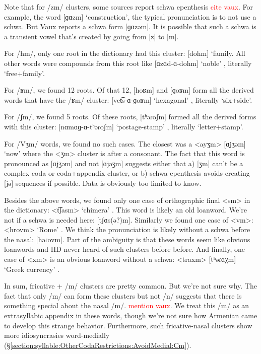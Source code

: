 	Note that for /zm/ clusters, some sources report schwa epenthesis \textcolor{red}{cite vaux}. For example, the word [ɡɑzm] `construction', the typical pronunciation is to not use a schwa. But Vaux reports a schwa form [ɡɑzəm]. It is possible that such a schwa is a transient vowel that's created by going from [z] to [m]. 
	
	
	For /hm/, only one root in the dictionary had this cluster:  [dohm] `family. All other words were compounds from this root like [ɑzɑd-ɑ-dohm] `noble' , literally `free+family'. 
	
	For /ʁm/, we found 12 roots. Of that 12, [hoʁm] and [ɡoʁm] form all the derived words that have the /ʁm/ cluster: [vet͡s-ɑ-ɡoʁm] `hexagonal' , literally `six+side'. 
	
	For /ʃm/, we found 5 roots. Of these roots, [tʰəɾoʃm] formed all the derived forms with this cluster: [nɑmɑɡ-ɑ-tʰəɾoʃm] `postage-stamp' , literally `letter+stamp'. 
	
	For /Vʒm/ words, we found no such cases. The closest was a <ayʒm> [ɑjʒəm] `now'  where the  <ʒm> cluster is after a consonant. The fact that this word is pronounced as [ɑjʒəm] and not [ɑjəʒm] suggests either that a) [ʒm] can't be a complex coda or coda+appendix cluster, or b) schwa epenthesis avoids creating [jə] sequences if possible. Data is obviously too limited to know. 
	
	
	Besides the above words, we found only  one case of orthographic final <sm> in the \citeauthor{kouyoumdjian-1970-DictionaryArmenianEnglish} dictionary: <t͡ʃasm> `chimera' . This word is   likely an old loanword. We're not if a schwa is needed here: [tʃɑs(ə?)m]. Similarly we found one case of <vm>: <hrovm> `Rome' . We think the pronunciation is likely without a schwa before the nasal: [həɾovm]. Part of the ambiguity is that these words seem like obvious loanwords and HD never heard of such clusters before before. And finally, one case of <xm> is an obvious loanword without a schwa: <traxm> [tʰəɾɑχm] `Greek currency'  . 
	
	In sum,    fricative + /m/ clusters are pretty common. But we're not sure why. The fact that only /m/ can form these clusters but not /n/ suggests that there is something special about the nasal /m/. \textcolor{red}{mention vaux}. We treat this /m/ as an extrasyllabic appendix in these words, though we're not sure how Armenian came to develop this strange behavior.  Furthermore, such fricative-nasal clusters show more idiosyncrasies word-medially (\S\ref{section:syllable:OtherCodaRestrictions:AvoidMedial:Cm}). 
	

